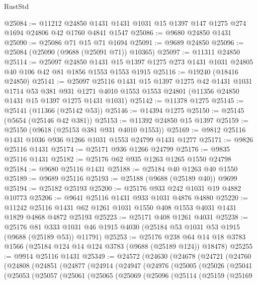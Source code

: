 \begin{lexlean}{RustStd}
\begin{coremodule}
@25084 := @11212
    @24850
    @1431
    @1431
    @1031
    @15
    @1397
    @147
    @1275
    @274
    @1694
    @24806
    @42
    @1760
    @4841
    @1547
@25086 := @9680 @24850 @1431
@25090 := @25086 @71 @15 @71 @1694
@25091 := @9689 @24850
@25096 := @25084 (@25090 (@9688 (@25091 @71)) @10365)
@25097 := @11311 @24850
@25114 := @25097
    @24850
    @1431
    @15
    @1397
    @1275
    @273
    @1431
    @1031
    @24805
    @40
    @106
    @42
    @81
    @1856
    @1553
    @1553
    @1915
@25116 := @19240 (@18416 @24850)
@25141 := @25097
    @25116
    @1431
    @15
    @1397
    @1275
    @42
    @1431
    @1031
    @1714
    @53
    @381
    @931
    @1271
    @4010
    @1553
    @1553
    @24801
    (@11356 @24850 @1431 @15 @1397 @1275 @1431 @1031)
@25142 := @11378 @1275
@25145 := @25141 (@11366 (@25142 @53))
@25146 := @14394 @1275
@25150 := @25145 (@5654 (@25146 @42 @381))
@25153 := @11392 @24850 @15 @1397
@25159 := @25150 (@9618 (@25153 @381 @931 @4010 @1553))
@25169 := @9812 @25116 @1431 @1036 @936 @1266 @1031 @1553 @24799 @1431 @1277
@25171 := @9826 @25116 @1431
@25174 := @25171 @936 @1266 @24799
@25176 := @9835 @25116 @1431
@25182 := @25176 @62 @935 @1263 @1265 @1550 @24798
@25184 := @9680 @25116 @1431
@25188 := @25184 @40 @1263 @40 @1550
@25189 := @9689 @25116
@25193 := @25188 (@9688 (@25189 @40)) @9699
@25194 := @25182 @25193
@25200 := @25176 @933 @242 @1031 @19 @4882 @10773
@25206 := @9641 @25116 @1431 @933 @1031 @4876 @4880
@25220 := @11242 @25116 @1431 @62 @1261 @1031 @1550 @408 @1553 @4031 @1431 @1829 @4868 @4872 @25193
@25223 := @25171 @408 @1261 @4031
@25238 := @25176
    @81
    @333
    @1031
    @46
    @1915
    @4030
    (@25184 @53 @1031 @53 @1915 (@9688 (@25189 @53)) @11791)
@25253 := @25176
    @238
    @64
    @14
    @18
    @3783
    @1566
    (@25184 @124 @14 @124 @3783 (@9688 (@25189 @124)) @18478)
@25255 := @9914 @25116 @1431
@25349 := @24572
    (@24630
      (@24678
        (@24721
          (@24760
            (@24808
              (@24851
                (@24877
                  (@24914
                    (@24947
                      (@24976
                        (@25005
                          (@25026
                            (@25041
                              (@25053
                                (@25057
                                  (@25061
                                    (@25065
                                      (@25069
                                        (@25096
                                          (@25114
                                            (@25159
                                              (@25169

\end{coremodule}
\end{lexlean}
